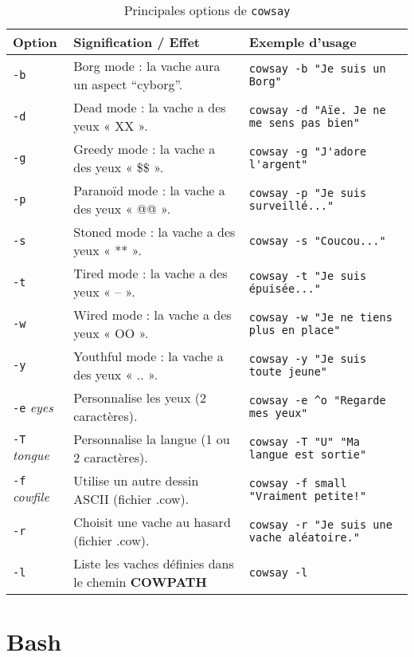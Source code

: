 \documentclass[a4paper,french,11pt]{article}
\begin{document}
\begin{table}[ht]
	\centering
	\begin{tabular}{|l|p{5cm}|p{8cm}|}
	\hline
	\textbf{Option} & \textbf{Signification / Effet} & \textbf{Exemple d’usage} \\
	\hline
	\texttt{-b} & Borg mode : la vache aura un aspect “cyborg”. & \verb|cowsay -b "Je suis un Borg"| \\ 
	\hline
	\texttt{-d} & Dead mode : la vache a des yeux « XX ». & \verb|cowsay -d "Aïe. Je ne me sens pas bien"| \\
	\hline
	\texttt{-g} & Greedy mode : la vache a des yeux « \$\$ ». & \verb|cowsay -g "J'adore l'argent"| \\
	\hline
	\texttt{-p} & Paranoïd mode : la vache a des yeux « @@ ». & \verb|cowsay -p "Je suis surveillé..."| \\
	\hline
	\texttt{-s} & Stoned mode : la vache a des yeux « ** ». & \verb|cowsay -s "Coucou..."| \\
	\hline
	\texttt{-t} & Tired mode : la vache a des yeux « -- ». & \verb|cowsay -t "Je suis épuisée..."| \\
	\hline
	\texttt{-w} & Wired mode : la vache a des yeux « OO ». & \verb|cowsay -w "Je ne tiens plus en place"| \\
	\hline
	\texttt{-y} & Youthful mode : la vache a des yeux « .. ». & \verb|cowsay -y "Je suis toute jeune"| \\
	\hline
	\texttt{-e} \emph{eyes} & Personnalise les yeux (2 caractères). & \verb|cowsay -e ^o "Regarde mes yeux"| \\
	\hline
	\texttt{-T} \emph{tongue} & Personnalise la langue (1 ou 2 caractères). & \verb|cowsay -T "U" "Ma langue est sortie"| \\
	\hline
	\texttt{-f} \emph{cowfile} & Utilise un autre dessin ASCII (fichier .cow). & \verb|cowsay -f small "Vraiment petite!"| \\
	\hline
	\texttt{-r} & Choisit une vache au hasard (fichier .cow). & \verb|cowsay -r "Je suis une vache aléatoire."| \\
	\hline
	\texttt{-l} & Liste les vaches définies dans le chemin \textbf{COWPATH} & \verb|cowsay -l| \\
	\hline
	\end{tabular}
	\caption{Principales options de \texttt{cowsay}}
	\label{tab:cowsay-options}
	\end{table}


\newpage
\section{Bash}
\end{document}
